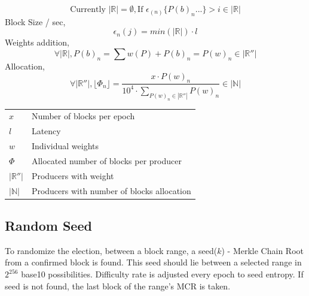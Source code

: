 \documentclass[a4paper,10pt]{article}
\makeatletter
\newenvironment{conditions}
  {\par\vspace{\abovedisplayskip}\noindent\begin{tabular}{>{$}l<{$} @{${}={}$} l}}
  {\end{tabular}\par\vspace{\belowdisplayskip}}
\makeatother
\begin{document}
\begin{equation*}
\text{Currently }|\mathbb{R}| = \emptyset, 
\text{If } \epsilon_{(n)}\{P(b)_n...\} > i \in |\mathbb{R}|
\end{equation*}
Block Size / sec,
\begin{equation*}
\epsilon_{n}(j)=min(|\mathbb{R}|) \cdot l
\end{equation*}
Weights addition,
\begin{equation*}
\forall |\mathbb{R}|, P(b)_n = \sum w(P) + P(b)_n = P(w)_n  \in |\mathbb{R}''|
\end{equation*}
Allocation,
\begin{equation*}
\forall |\mathbb{R}''|, \lfloor \Phi_{n} \rfloor = \frac{x \cdot P(w)_n}{10^4 \cdot \sum_{P(w)_n \in |\mathbb{R}''|} P(w)_n} \in |\mathbb{N}|
\end{equation*}

\begin{conditions}
x & Number of blocks per epoch\\
l & Latency\\
w & Individual weights\\
\Phi & Allocated number of blocks per producer\\
|\mathbb{R}''| & Producers with weight \\
|\mathbb{N}| & Producers with number of blocks allocation

\end{conditions}

\subsection{Random Seed}

To randomize the election, between a block range, a seed($k$) - Merkle Chain Root from a confirmed block is found. This seed should lie between a selected range in $2^{256}$ base10 possibilities. Difficulty rate is adjusted every epoch to seed entropy. If seed is not found, the last block of the range's MCR is taken. 
\end{document}
